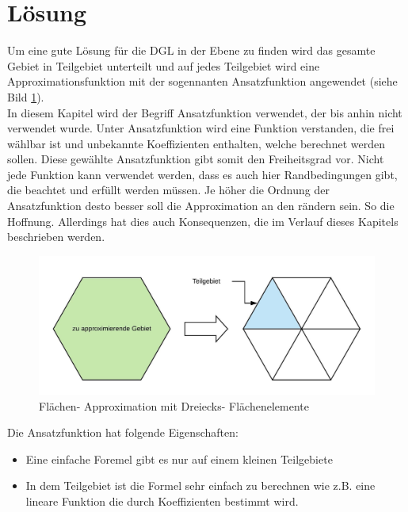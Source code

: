 %
%
%
\section{Lösung
\label{fem:section:loesung}}
Um eine gute Lösung für die DGL in der Ebene zu finden wird das gesamte Gebiet in Teilgebiet unterteilt und auf jedes Teilgebiet wird eine Approximationsfunktion mit der sogennanten Ansatzfunktion angewendet (siehe Bild \ref{fem:Approx}).\\
In diesem Kapitel wird der Begriff Ansatzfunktion verwendet, der bis anhin nicht verwendet wurde. Unter Ansatzfunktion wird eine Funktion verstanden, die frei wählbar ist und unbekannte Koeffizienten enthalten, welche berechnet werden sollen. Diese gewählte Ansatzfunktion gibt somit den Freiheitsgrad vor. Nicht jede Funktion kann verwendet werden, dass es auch hier Randbedingungen gibt, die beachtet und erfüllt werden müssen. Je höher die Ordnung der Ansatzfunktion desto besser soll die Approximation an den rändern sein. So die Hoffnung. Allerdings hat dies auch Konsequenzen, die im Verlauf dieses Kapitels beschrieben werden. \\

\begin{figure}[h!]
	\centering
	\includegraphics[scale=0.8]{papers/fem/Images/Approx.jpeg}
	\caption{Flächen- Approximation mit Dreiecks- Flächenelemente}
	\label{fem:Approx}
\end{figure}

Die Ansatzfunktion hat folgende Eigenschaften:
\begin{itemize}
	\item Eine einfache Foremel gibt es nur auf einem kleinen Teilgebiete
	\item In dem Teilgebiet ist die Formel sehr einfach zu berechnen wie z.B. eine lineare Funktion die durch Koeffizienten bestimmt wird.
\end{itemize}


